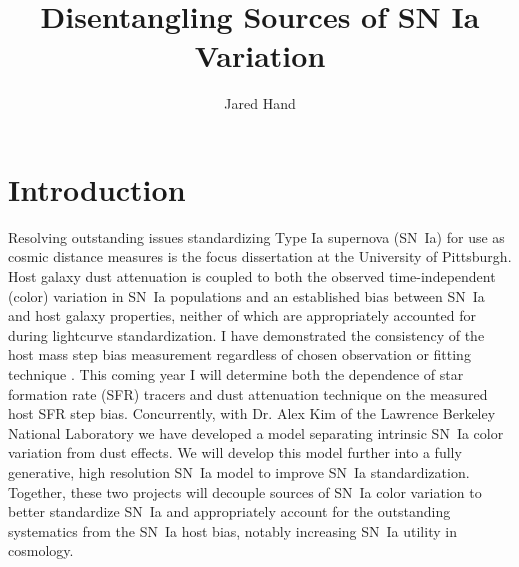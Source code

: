 \documentclass[modern]{aastex63}
\begin{document}
\title{Disentangling Sources of SN Ia Variation}

\author{Jared Hand}

\section{Introduction}
Resolving outstanding issues standardizing Type Ia supernova (SN~Ia) for use as cosmic distance measures is the focus dissertation at the University of Pittsburgh. Host galaxy dust attenuation is coupled to both the observed time-independent (color) variation in SN~Ia populations and an established bias between SN~Ia and host galaxy properties, neither of which are appropriately accounted for during lightcurve standardization. I have demonstrated the consistency of the host mass step bias measurement regardless of chosen observation or fitting technique \citep{Hand2021}. This coming year I will determine both the dependence of star formation rate (SFR) tracers and dust attenuation technique on the measured host SFR step bias. Concurrently, with Dr. Alex Kim of the Lawrence Berkeley National Laboratory we have developed a model separating intrinsic SN~Ia color variation from dust effects. We will develop this model further into a fully generative, high resolution SN~Ia model to improve SN~Ia standardization.  Together, these two projects will decouple sources of SN~Ia color variation to better standardize SN~Ia and appropriately account for the outstanding systematics from the SN~Ia host bias, notably increasing SN~Ia utility in cosmology.
\end{document}
